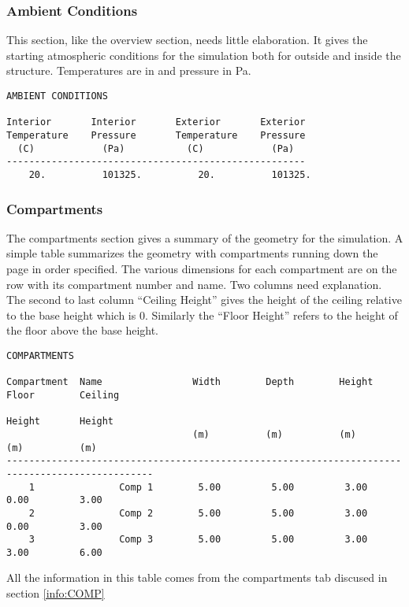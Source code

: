 \subsubsection{Ambient Conditions}

This section, like the overview section, needs little elaboration.  It gives the starting atmospheric conditions for the simulation both for outside and inside the structure. Temperatures are in \degc and pressure in Pa.
\begin{lstlisting}[basicstyle=\tiny]
AMBIENT CONDITIONS

Interior       Interior       Exterior       Exterior
Temperature    Pressure       Temperature    Pressure
  (C)            (Pa)           (C)            (Pa)
-----------------------------------------------------
    20.          101325.          20.          101325.
\end{lstlisting}

\subsubsection{Compartments}
The compartments section gives a summary of the geometry for the simulation.  A simple table summarizes the geometry with compartments running down the page in order specified.  The various dimensions for each compartment are on the row with its compartment number and name.  Two columns need explanation.  The second to last column ``Ceiling Height'' gives the height of the ceiling relative to the base height which is 0.  Similarly the ``Floor Height'' refers to the height of the floor above the base height.

\begin{lstlisting}[basicstyle=\tiny]
COMPARTMENTS

Compartment  Name                Width        Depth        Height       Floor        Ceiling
                                                                        Height       Height
                                 (m)          (m)          (m)          (m)          (m)
------------------------------------------------------------------------------------------------
    1               Comp 1        5.00         5.00         3.00         0.00         3.00
    2               Comp 2        5.00         5.00         3.00         0.00         3.00
    3               Comp 3        5.00         5.00         3.00         3.00         6.00
\end{lstlisting}
All the information in this table comes from the compartments tab discused in section  \ref{info:COMP}


